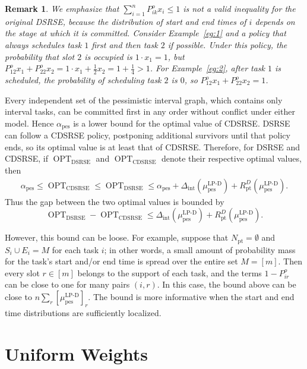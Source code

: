 \documentclass{article}
\newtheorem{remark}[theorem]{Remark}
\DeclareMathOperator{\pes}{pes}
\begin{document}
\begin{remark}
    We emphasize that $\sum_{i=1}^{n}P_{ik}^{o}x_i\leq 1$ is not a valid inequality for the original DSRSE, because the distribution of start and end times of $i$ depends on the stage at which it is committed. 
Consider Example~\ref{eg:1} and a policy that always schedules task $1$ first and then task $2$ if possible.
Under this policy, the probability that slot $2$ is occupied is $1\cdot x_1 = 1$, but $P_{12}^ox_1+P_{22}^o x_2= 1\cdot x_1+\frac{1}{2}x_2=1+\frac{1}{4}>1$.
For Example~\ref{eg:2}, after task $1$ is scheduled, the probability of scheduling task $2$ is $0$, so $P_{12}^ox_1+P_{22}^o x_2= 1$.
\end{remark}
{Every independent set of the pessimistic interval graph, which contains only interval tasks, can be committed first in any order without conflict under either model. Hence $\alpha_{\pes}$ is a lower bound for the optimal value of CDSRSE. DSRSE can follow a CDSRSE policy, postponing additional survivors until that policy ends, so its optimal value is at least that of CDSRSE.} Therefore, for DSRSE and CDSRSE, if $\operatorname{OPT}_{\operatorname{DSRSE}}$ and $\operatorname{OPT}_{\operatorname{CDSRSE}}$ denote their respective optimal values, then
{
\begin{align*}
\alpha_{\pes}
\leq\operatorname{OPT}_{\operatorname{CDSRSE}}
\leq\operatorname{OPT}_{\operatorname{DSRSE}}\leq\alpha_{\pes}+\Delta_{\mathrm{int}}(\mu^{\operatorname{LP-D}}_{\pes})+R_{\mathrm{pt}}^D(\mu^{\operatorname{LP-D}}_{\pes}).
\end{align*}}
Thus the gap between the two optimal values is bounded by
{
\[
\operatorname{OPT}_{\operatorname{DSRSE}}-\operatorname{OPT}_{\operatorname{CDSRSE}}
\leq\Delta_{\mathrm{int}}(\mu^{\operatorname{LP-D}}_{\pes})+R_{\mathrm{pt}}^D(\mu^{\operatorname{LP-D}}_{\pes}).
\]}

However, this bound can be loose. For example, suppose that {$N_{\mathrm{pt}}=\emptyset$ and }$ S_i \cup E_i = M $ for each task $i$; in other words, a small amount of probability mass for the task's start and/or end time is spread over the entire set $M = [m]$. Then every {slot} $r\in[m]$ belongs to the support of each task, and the terms $1-P_{ir}^o$ can be close to one for many pairs $(i,r)$. In this case, the bound above can be close to
\(
n\sum_r [{\mu^{\operatorname{LP-D}}_{\pes}}]_r .
\)
The bound is more informative when the start and end time distributions are sufficiently localized.

\section{Uniform Weights}
\end{document}
